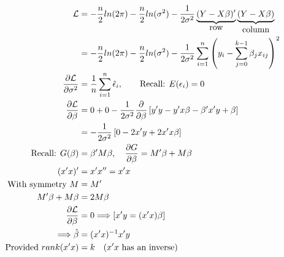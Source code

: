 	\begin{align*}
		\mathcal{L}&=-\frac{n}{2}ln(2\pi)-\frac{n}{2}ln(\sigma^2)-\frac{1}{2\sigma^2}\underbrace{(Y-X\beta)'}_{\hbox{row}}\underbrace{(Y-X\beta)}_{\hbox{column}}\\
		&=-\frac{n}{2}ln(2\pi)-\frac{n}{2}ln(\sigma^2)-\frac{1}{2\sigma^2}\sum\limits_{i=1}^n \left(y_i - \sum\limits_{j=0}^{k-1} \beta_j x_{ij} \right)^2\\
		\frac{\partial\mathcal{L}}{\partial\sigma^2}&=\frac{1}{n}\sum\limits_{i=1}^n \hat{\epsilon}_i,\qquad\text{Recall: }E(\epsilon_i)=0\\
		\frac{\partial\mathcal{L}}{\partial\beta}&=0+0-\frac{1}{2\sigma^2}\frac{\partial}{\partial\beta}\left[y'y-y'x\beta-\beta'x'y+\beta\right]\\
		&=-\frac{1}{2\sigma^2}\left[0-2x'y+2x'x\beta\right]\\
		\text{Recall: }G(\beta)&=\beta' M \beta,\quad \frac{\partial G}{\partial\beta}=M'\beta+M\beta\\
		(x'x)'&=x'x''=x'x\\
		\text{With symmetry }M&=M'\\
		M'\beta+M\beta&=2M\beta\\
		\frac{\partial\mathcal{L}}{\partial\beta}&=0\Longrightarrow\left[x'y=(x'x)\beta\right]\\
		\Longrightarrow\hat{\beta}&=(x'x)^{-1}x'y\\
		\text{Provided }rank(x'x)&=k\quad (x'x \text{ has an inverse})
	\end{align*}
